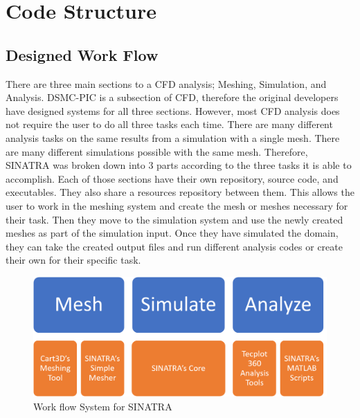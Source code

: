 \section{Code Structure}
\subsection{Designed Work Flow}
There are three main sections to a CFD analysis; Meshing, Simulation, and Analysis. DSMC-PIC is a subsection of CFD, therefore the original developers have designed systems for all three sections. However, most  CFD analysis does not require the user to do all three tasks each time. There are many different analysis tasks on the same results from a simulation with a single mesh. There are many different simulations possible with the same mesh. Therefore, SINATRA was broken down into 3 parts according to the three tasks it is able to accomplish. Each of those sections have their own repository, source code, and executables. They also share a resources repository between them. This allows the user to work in the meshing system and create the mesh or meshes necessary for their task. Then they move to the simulation system and use the newly created meshes as part of the simulation input. Once they have simulated the domain, they can take the created output files and run different analysis codes or create their own for their specific task. 



\begin{figure}
\includegraphics[width=.95\textwidth]{figures/UserWorkFlow.png}
\centering
\caption{Work flow System for SINATRA}
\label{fig:UserWorkFlow}
\end{figure}

